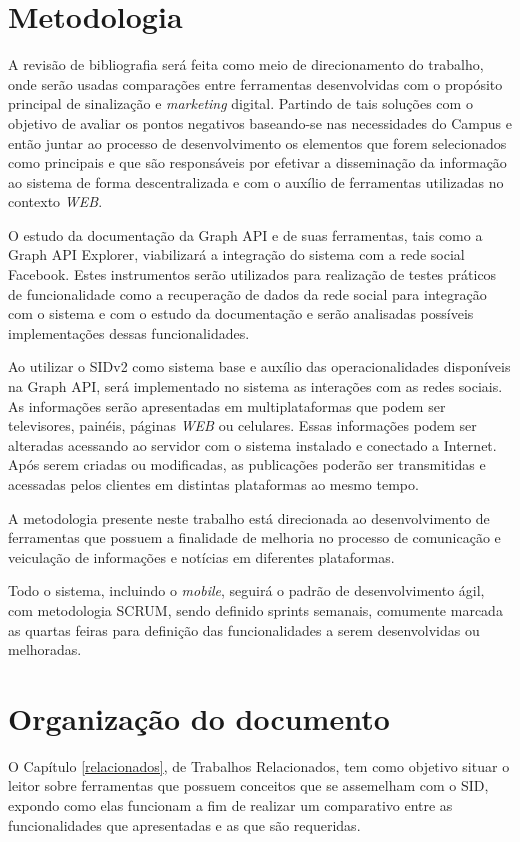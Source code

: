 \section{Metodologia}
A revisão de bibliografia será feita como meio de direcionamento do trabalho, onde serão usadas comparações entre ferramentas desenvolvidas com o propósito principal de sinalização e \textit{marketing} digital. Partindo de tais soluções com o objetivo de avaliar os pontos negativos baseando-se nas necessidades do Campus e então juntar ao processo de desenvolvimento os elementos que forem selecionados como principais e que são responsáveis por efetivar a disseminação da informação ao sistema de forma descentralizada e com o auxílio de ferramentas utilizadas no contexto \textit{WEB}.

O estudo da documentação da Graph API e de suas ferramentas, tais como a Graph API Explorer, viabilizará a integração do sistema com a rede social Facebook. Estes instrumentos serão utilizados para realização de testes práticos de funcionalidade como a recuperação de dados da rede social para integração com o sistema e com o estudo da documentação e serão analisadas possíveis implementações dessas funcionalidades.
	 
Ao utilizar o SIDv2 como sistema base e auxílio das operacionalidades  disponíveis na Graph API, será implementado no sistema as interações com as redes sociais. As informações serão apresentadas em multiplataformas que podem ser televisores, painéis, páginas \textit{WEB} ou celulares. Essas informações podem ser alteradas acessando ao servidor com o sistema instalado e conectado a Internet. Após serem criadas ou modificadas, as publicações poderão ser transmitidas e acessadas pelos clientes em distintas plataformas ao mesmo tempo.

A metodologia presente neste trabalho está direcionada ao desenvolvimento de ferramentas que possuem a finalidade de melhoria no processo de comunicação e veiculação de informações e notícias em diferentes plataformas. 

Todo o sistema, incluindo o \textit{mobile}, seguirá o padrão de desenvolvimento ágil, com metodologia SCRUM, sendo definido sprints semanais, comumente marcada as quartas feiras para definição das funcionalidades a serem desenvolvidas ou melhoradas. 

\section{Organização do documento}
O Capítulo \ref{relacionados}, de Trabalhos Relacionados, tem como objetivo situar o leitor sobre ferramentas que possuem conceitos que se assemelham com o SID, expondo como elas funcionam a fim de realizar um comparativo entre as funcionalidades que apresentadas e as que são requeridas.

